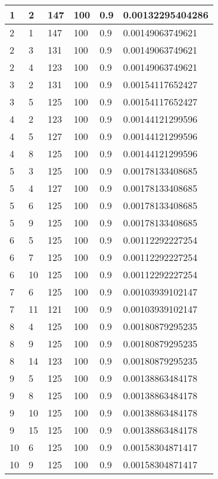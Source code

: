 \begin{longtable}{|l|l|l|l|l|l|}
1  & 2  & 147 & 100 & 0.9 & 0.00132295404286 \\ \hline
2  & 1  & 147 & 100 & 0.9 & 0.00149063749621 \\ \hline
2  & 3  & 131 & 100 & 0.9 & 0.00149063749621 \\ \hline
2  & 4  & 123 & 100 & 0.9 & 0.00149063749621 \\ \hline
3  & 2  & 131 & 100 & 0.9 & 0.00154117652427 \\ \hline
3  & 5  & 125 & 100 & 0.9 & 0.00154117652427 \\ \hline
4  & 2  & 123 & 100 & 0.9 & 0.00144121299596 \\ \hline
4  & 5  & 127 & 100 & 0.9 & 0.00144121299596 \\ \hline
4  & 8  & 125 & 100 & 0.9 & 0.00144121299596 \\ \hline
5  & 3  & 125 & 100 & 0.9 & 0.00178133408685 \\ \hline
5  & 4  & 127 & 100 & 0.9 & 0.00178133408685 \\ \hline
5  & 6  & 125 & 100 & 0.9 & 0.00178133408685 \\ \hline
5  & 9  & 125 & 100 & 0.9 & 0.00178133408685 \\ \hline
6  & 5  & 125 & 100 & 0.9 & 0.00112292227254 \\ \hline
6  & 7  & 125 & 100 & 0.9 & 0.00112292227254 \\ \hline
6  & 10 & 125 & 100 & 0.9 & 0.00112292227254 \\ \hline
7  & 6  & 125 & 100 & 0.9 & 0.00103939102147 \\ \hline
7  & 11 & 121 & 100 & 0.9 & 0.00103939102147 \\ \hline
8  & 4  & 125 & 100 & 0.9 & 0.00180879295235 \\ \hline
8  & 9  & 125 & 100 & 0.9 & 0.00180879295235 \\ \hline
8  & 14 & 123 & 100 & 0.9 & 0.00180879295235 \\ \hline
9  & 5  & 125 & 100 & 0.9 & 0.00138863484178 \\ \hline
9  & 8  & 125 & 100 & 0.9 & 0.00138863484178 \\ \hline
9  & 10 & 125 & 100 & 0.9 & 0.00138863484178 \\ \hline
9  & 15 & 125 & 100 & 0.9 & 0.00138863484178 \\ \hline
10 & 6  & 125 & 100 & 0.9 & 0.00158304871417 \\ \hline
10 & 9  & 125 & 100 & 0.9 & 0.00158304871417 \\ \hline

\end{longtable}
